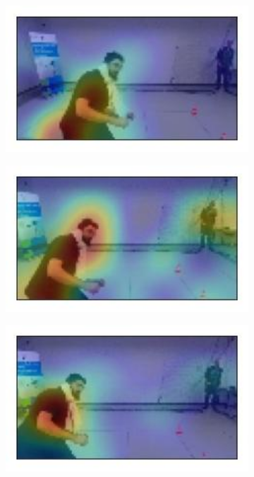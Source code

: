 \begin{figure}[!h]
\begin{center}
\begin{subfigure}[h]{0.24\textwidth}
		\end{subfigure}
		\hfill
		\begin{subfigure}[h]{0.24\textwidth}
			\centering
			\includegraphics[width=1\textwidth]{"contents/images/gradcam/gradcam-beard-10"}
		\end{subfigure}
		\hfill
		\begin{subfigure}[h]{0.24\textwidth}
			\centering
			\includegraphics[width=1\textwidth]{"contents/images/gradcam/gradcam-beard-11"}
		\end{subfigure}
		\hfill
		\begin{subfigure}[h]{0.24\textwidth}
			\centering
			\includegraphics[width=1\textwidth]{"contents/images/gradcam/gradcam-beard-12"}

\end{subfigure}
\end{center}
\end{figure}
